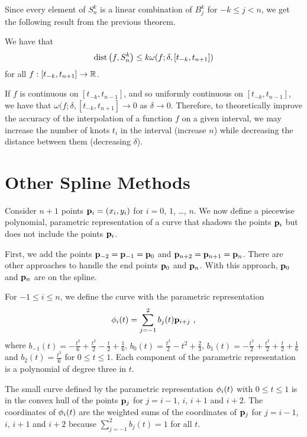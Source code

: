 Since every element of $S_n^k$ is a linear combination of
$B_{j}^k$ for $-k \leq j <n$, we get the following result from the
previous theorem.

\begin{cor}
We have that
\[
  \mathrm{dist}\left(f,S_n^k\right) \leq k \omega(f;\delta, [t_{-k},t_{n+1}])
\]
for all $f:[t_{-k},t_{n+1}] \to \mathbb{R}$.
\end{cor}

If $f$ is continuous on $[t_{-k},t_{n-1}]$, and so uniformly
continuous on $[t_{-k},t_{n-1}]$, we have that 
$\omega(f;\delta, [t_{-k},t_{n+1}] \to 0$ as $\delta \to 0$.
Therefore, to theoretically improve the accuracy of the interpolation of a
function $f$ on a given interval, we may increase the number of knots
$t_i$ in the interval (increase $n$) while decreasing the
distance between them (decreasing $\delta$).

\section{Other Spline Methods}

Consider $n+1$ points $\mathbf{p}_i = (x_i,y_i)$ for $i=0$, $1$,
\ldots, $n$.  We now define a piecewise polynomial, parametric
representation of a curve that shadows the points $\mathbf{p}_i$
but does not include the points $\mathbf{p}_i$.

First, we add the points $\mathbf{p}_{-2} = \mathbf{p}_{-1} = \mathbf{p}_0$ and
$\mathbf{p}_{n+2} = \mathbf{p}_{n+1} = \mathbf{p}_n$.  There are other
approaches to handle the end points $\mathbf{p}_0$ and $\mathbf{p}_n$.  With
this approach, $\mathbf{p}_0$ and $\mathbf{p}_n$ are on the spline.

For $-1 \leq i \leq n$, we define the curve with the parametric
representation
\begin{equation} \label{Bspline}
\mathbf{\phi}_i(t) = \sum_{j=-1}^2 b_j(t) \mathbf{p}_{i+j} \  ,
\end{equation}
where
$\displaystyle
b_{-1}(t) = -\frac{t^3}{6} + \frac{t^2}{2} - \frac{t}{2} + \frac{1}{6}$,
$\displaystyle b_0(t) = \frac{t^3}{2} - t^2 + \frac{2}{3}$,
$\displaystyle
b_1(t) = -\frac{t^3}{2} + \frac{t^2}{2} + \frac{t}{2} + \frac{1}{6}$
and
$\displaystyle b_2(t) = \frac{t^3}{6}$
for $0 \leq t \leq 1$.  Each component of the parametric representation
is a polynomial of degree three in $t$.

The small curve defined by the parametric representation
$\mathbf{\phi}_i(t)$ with $0\leq t \leq 1$ is in the convex hull of the 
points $\mathbf{p}_j$ for $j=i-1$, $i$, $i+1$ and $i+2$.  The coordinates
of $\mathbf{\phi}_i(t)$ are the weighted sums of the coordinates of
$\mathbf{p}_j$ for $j=i-1$, $i$, $i+1$ and $i+2$ because
$\displaystyle \sum_{j=-1}^2 b_j(t) = 1 $ for all $t$.

